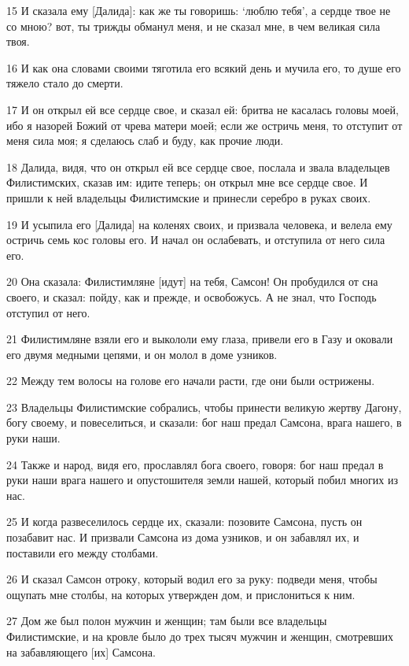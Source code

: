 \par 15 И сказала ему [Далида]: как же ты говоришь: `люблю тебя', а сердце твое не со мною? вот, ты трижды обманул меня, и не сказал мне, в чем великая сила твоя.
\par 16 И как она словами своими тяготила его всякий день и мучила его, то душе его тяжело стало до смерти.
\par 17 И он открыл ей все сердце свое, и сказал ей: бритва не касалась головы моей, ибо я назорей Божий от чрева матери моей; если же остричь меня, то отступит от меня сила моя; я сделаюсь слаб и буду, как прочие люди.
\par 18 Далида, видя, что он открыл ей все сердце свое, послала и звала владельцев Филистимских, сказав им: идите теперь; он открыл мне все сердце свое. И пришли к ней владельцы Филистимские и принесли серебро в руках своих.
\par 19 И усыпила его [Далида] на коленях своих, и призвала человека, и велела ему остричь семь кос головы его. И начал он ослабевать, и отступила от него сила его.
\par 20 Она сказала: Филистимляне [идут] на тебя, Самсон! Он пробудился от сна своего, и сказал: пойду, как и прежде, и освобожусь. А не знал, что Господь отступил от него.
\par 21 Филистимляне взяли его и выкололи ему глаза, привели его в Газу и оковали его двумя медными цепями, и он молол в доме узников.
\par 22 Между тем волосы на голове его начали расти, где они были острижены.
\par 23 Владельцы Филистимские собрались, чтобы принести великую жертву Дагону, богу своему, и повеселиться, и сказали: бог наш предал Самсона, врага нашего, в руки наши.
\par 24 Также и народ, видя его, прославлял бога своего, говоря: бог наш предал в руки наши врага нашего и опустошителя земли нашей, который побил многих из нас.
\par 25 И когда развеселилось сердце их, сказали: позовите Самсона, пусть он позабавит нас. И призвали Самсона из дома узников, и он забавлял их, и поставили его между столбами.
\par 26 И сказал Самсон отроку, который водил его за руку: подведи меня, чтобы ощупать мне столбы, на которых утвержден дом, и прислониться к ним.
\par 27 Дом же был полон мужчин и женщин; там были все владельцы Филистимские, и на кровле было до трех тысяч мужчин и женщин, смотревших на забавляющего [их] Самсона.
